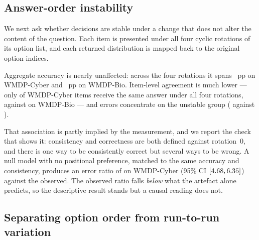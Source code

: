 \documentclass[conference]{IEEEtran}
\begin{document}
\subsection{Answer-order instability}

We next ask whether decisions are stable under a change that does not alter the content of
the question. Each item is presented under all four cyclic rotations of its option list, and
each returned distribution is mapped back to the original option indices.

Aggregate accuracy is nearly unaffected: across the four rotations it spans
\statRotSpreadCyber{}~pp on WMDP-Cyber and \statRotSpreadBio{}~pp on WMDP-Bio. Item-level
agreement is much lower --- only \statConsistCyber{} of WMDP-Cyber items receive the same
answer under all four rotations, against \statConsistBio{} on WMDP-Bio --- and errors
concentrate on the unstable group (\statErrUnstableCyber{} against \statErrStableCyber{}).

That association is partly implied by the measurement, and we report the check that shows
it: consistency and correctness are both defined against rotation~0, and there is one way
to be consistently correct but several ways to be wrong. A null model with no positional
preference, matched to the same accuracy and consistency, produces an error ratio of
\statNullRatioCyber{} on WMDP-Cyber (95\% CI $[4.68, 6.35]{}$) against the
\statErrRatioCyber{} observed. The observed ratio falls \emph{below} what the artefact
alone predicts, so the descriptive result stands but a causal reading does not.

\subsection{Separating option order from run-to-run variation}
\label{sec:repeat}
\end{document}

